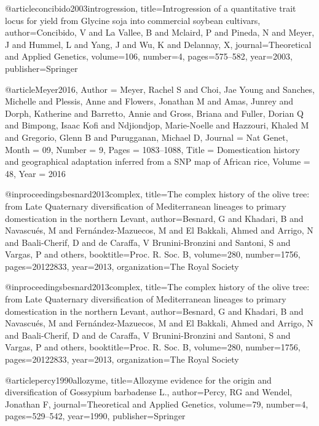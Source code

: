 @article{concibido2003introgression,
  title={Introgression of a quantitative trait locus for yield from Glycine soja into commercial soybean cultivars},
  author={Concibido, V and La Vallee, B and Mclaird, P and Pineda, N and Meyer, J and Hummel, L and Yang, J and Wu, K and Delannay, X},
  journal={Theoretical and Applied Genetics},
  volume={106},
  number={4},
  pages={575--582},
  year={2003},
  publisher={Springer}
}


@article{Meyer2016,
	Author = {Meyer, Rachel S and Choi, Jae Young and Sanches, Michelle and Plessis, Anne and Flowers, Jonathan M and Amas, Junrey and Dorph, Katherine and Barretto, Annie and Gross, Briana and Fuller, Dorian Q and Bimpong, Isaac Kofi and Ndjiondjop, Marie-Noelle and Hazzouri, Khaled M and Gregorio, Glenn B and Purugganan, Michael D},
	Journal = {Nat Genet},
	Month = {09},
	Number = {9},
	Pages = {1083--1088},
	Title = {Domestication history and geographical adaptation inferred from a SNP map of African rice},
	Volume = {48},
	Year = {2016}}

@inproceedings{besnard2013complex,
  title={The complex history of the olive tree: from Late Quaternary diversification of Mediterranean lineages to primary domestication in the northern Levant},
  author={Besnard, G and Khadari, B and Navascu{\'e}s, M and Fern{\'a}ndez-Mazuecos, M and El Bakkali, Ahmed and Arrigo, N and Baali-Cherif, D and de Caraffa, V Brunini-Bronzini and Santoni, S and Vargas, P and others},
  booktitle={Proc. R. Soc. B},
  volume={280},
  number={1756},
  pages={20122833},
  year={2013},
  organization={The Royal Society}
}

@inproceedings{besnard2013complex,
  title={The complex history of the olive tree: from Late Quaternary diversification of Mediterranean lineages to primary domestication in the northern Levant},
  author={Besnard, G and Khadari, B and Navascu{\'e}s, M and Fern{\'a}ndez-Mazuecos, M and El Bakkali, Ahmed and Arrigo, N and Baali-Cherif, D and de Caraffa, V Brunini-Bronzini and Santoni, S and Vargas, P and others},
  booktitle={Proc. R. Soc. B},
  volume={280},
  number={1756},
  pages={20122833},
  year={2013},
  organization={The Royal Society}
}

@article{percy1990allozyme,
  title={Allozyme evidence for the origin and diversification of Gossypium barbadense L.},
  author={Percy, RG and Wendel, Jonathan F},
  journal={Theoretical and Applied Genetics},
  volume={79},
  number={4},
  pages={529--542},
  year={1990},
  publisher={Springer}
}

